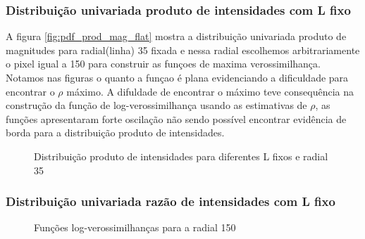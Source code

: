 \subsubsection{Distribuição univariada produto de intensidades com L fixo}

A figura \eqref{fig:pdf_prod_mag_flat} mostra a distribuição univariada produto de magnitudes para radial(linha) 35 fixada e nessa radial escolhemos arbitrariamente o pixel igual a 150 para construir as funçoes de maxima verossimilhança. Notamos nas figuras o quanto a funçao é plana evidenciando a dificuldade para encontrar o $\rho$ máximo. A difuldade de encontrar o máximo teve consequência na construção da função de log-verossimilhança usando as estimativas de $\rho$, as funções apresentaram forte oscilação não sendo possível encontrar evidência de borda para a distribuição produto de intensidades. 

\begin{figure}[hbt]
	\centering
     \caption{Distribuição produto de intensidades para diferentes L fixos e radial 35}
     \label{fig:pdf_prod_mag_flat}
   \end{figure}	


\subsubsection{Distribuição univariada razão de intensidades com L fixo}



    
\begin{figure}[hbt]
	\centering
     \caption{Funções log-verossimilhanças para a radial 150}
     \label{fig:evid_bordas_l}
   \end{figure}	


